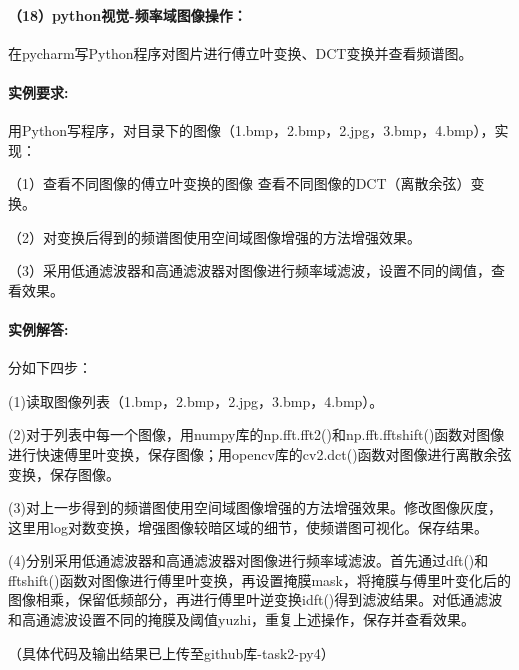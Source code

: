 \documentclass[a4paper, 12pt]{article}
\begin{document}
	\paragraph{（18）python视觉-频率域图像操作：}	
	在pycharm写Python程序对图片进行傅立叶变换、DCT变换并查看频谱图。
	
	\paragraph{实例要求:}
	用Python写程序，对目录下的图像（1.bmp，2.bmp，2.jpg，3.bmp，4.bmp），实现： 
	
	（1）查看不同图像的傅立叶变换的图像 查看不同图像的DCT（离散余弦）变换。 
	
	（2）对变换后得到的频谱图使用空间域图像增强的方法增强效果。
	
	（3）采用低通滤波器和高通滤波器对图像进行频率域滤波，设置不同的阈值，查看效果。
	
	\paragraph{实例解答:}
	分如下四步：
	
	(1)读取图像列表（1.bmp，2.bmp，2.jpg，3.bmp，4.bmp）。
	
	(2)对于列表中每一个图像，用numpy库的np.fft.fft2()和np.fft.fftshift()函数对图像进行快速傅里叶变换，保存图像；用opencv库的cv2.dct()函数对图像进行离散余弦变换，保存图像。
	
	(3)对上一步得到的频谱图使用空间域图像增强的方法增强效果。修改图像灰度，这里用log对数变换，增强图像较暗区域的细节，使频谱图可视化。保存结果。
	
	(4)分别采用低通滤波器和高通滤波器对图像进行频率域滤波。首先通过dft()和fftshift()函数对图像进行傅里叶变换，再设置掩膜mask，将掩膜与傅里叶变化后的图像相乘，保留低频部分，再进行傅里叶逆变换idft()得到滤波结果。对低通滤波和高通滤波设置不同的掩膜及阈值yuzhi，重复上述操作，保存并查看效果。
	
	（具体代码及输出结果已上传至github库-task2-py4）
	
\end{document}
